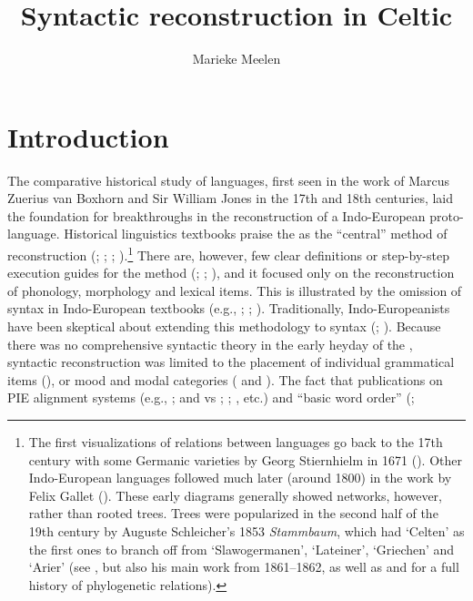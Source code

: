 \documentclass[output=paper,colorlinks,citecolor=brown]{langscibook}
\title{Syntactic reconstruction in Celtic}
\author{Marieke Meelen\affiliation{University of Cambridge}}
\begin{document}
\maketitle


\section{Introduction}

The comparative historical study of languages, first seen in the work of Marcus Zuerius van Boxhorn and Sir William Jones in the 17th and 18th centuries, laid the foundation for breakthroughs in the reconstruction of a Indo-European proto-language. Historical linguistics textbooks praise the  as the ``central” method of reconstruction (\citealt{mm:campbell_historical_2013}; \citealt{mm:TraskR.L1996Hl}; \citealt{mm:fox1995linguistic}; \citealt{mm:hock_principles_1991}).\footnote{The first visualizations of relations between languages go back to the 17th century with some Germanic varieties by Georg Stiernhielm in 1671 (\citealt{mm:sutrop2012estonian}). Other Indo-European languages followed much later (around 1800) in the work by Felix Gallet (\citealt{mm:auroux1990representation}). These early diagrams generally showed networks, however, rather than rooted trees. Trees were popularized in the second half of the 19th century by Auguste Schleicher's 1853 \textit{Stammbaum}, which had `Celten' as the first ones to branch off from `Slawogermanen', `Lateiner', `Griechen' and `Arier' (see \citealt{mm:schleicher_ersten_1853}, but also his main work from 1861–1862, as well as \citealt{mm:Morrison2016} and \citealt{mm:Pellardetal2024} for a full history of phylogenetic relations).} There are, however, few clear definitions or step-by-step execution guides for the method (\cite[57]{mm:fox1995linguistic}; \citealt{mm:durie_regularity_1996}; \citealt{mm:Walkden2014}), and it focused only on the reconstruction of phonology, morphology and lexical items. This is illustrated by the omission of syntax in Indo-European textbooks (e.g., \citealt{mm:beekes_comparative_1995}; \citealt{mm:szemerenyi_introduction_1996}; \citealt{mm:krasukhin_was_2017}). Traditionally, Indo-Europeanists have been skeptical about extending this methodology to syntax (\citealt{mm:meillet_methode_1954}; \citealt{mm:jeffers_syntactic_1976}). Because there was no comprehensive syntactic theory in the early heyday of the , syntactic reconstruction was limited to the placement of individual grammatical items (\citealt{mm:wackernagel1892}), or mood and modal categories (\citealt{mm:thurneysen1885oskische} and \citealt{mm:delbruck_vergleichende_1893}). The fact that publications on PIE alignment systems (e.g., \citealt{mm:uhlenbeck_agens_1901}; \citealt{mm:pedersen_neues_1907} and \citealt{mm:vaillant_lergatif_1936} vs \citealt{mm:villar_ergatividad_1983}; \citealt{mm:rumsey_chimera_1987}; \citealt{mm:lehmann_theoretical_1993}, etc.) and “basic word order” (\citealt{mm:dressler_textsyntaktische_1969}; 
\end{document}
